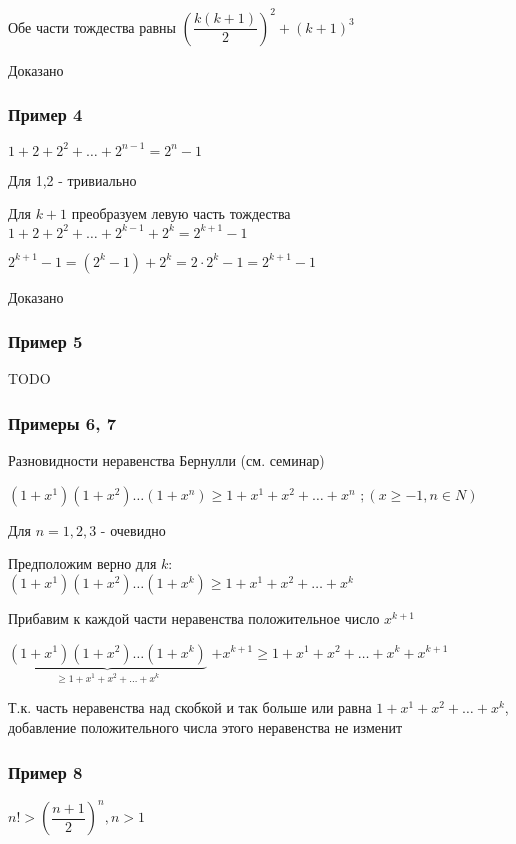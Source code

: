 Обе части тождества равны $  \left( \dfrac{k(k+1)}{2} \right)^{2} + (k+1)^{3} $

Доказано

\subsubsection{Пример 4}

$ 1 + 2 + 2^{2} + \ldots + 2^{n-1} = 2^{n} - 1  $

Для 1,2 - тривиально

Для $ k+1 $ преобразуем левую часть тождества
$ 1 + 2 + 2^{2} + \ldots + 2^{k-1} + 2^{k} = 2^{k+1} - 1  $

$ 2^{k+1} - 1 = (2^{k} - 1) + 2^{k} = 2 \cdot 2^{k} - 1 = 2^{k+1} - 1 $

Доказано

\subsubsection{Пример 5}

TODO

\subsubsection{Примеры 6, 7}

Разновидности неравенства Бернулли (см. семинар)

$(1+x^{1})(1+x^{2}) \ldots (1+x^{n}) \ge 1 + x^{1} + x^{2} + \ldots + x^{n}$
$; (x \ge -1, n \in N  ) $

Для $ n = 1,2,3 $ - очевидно

Предположим верно для $k$:
$(1+x^{1})(1+x^{2}) \ldots (1+x^{k}) \ge 1 + x^{1} + x^{2} + \ldots + x^{k}$

Прибавим к каждой части неравенства положительное число $ x^{k+1} $

$ \underbrace{(1+x^{1})(1+x^{2}) \ldots (1+x^{k})}_{\ge 1 + x^{1} + x^{2} + \ldots + x^{k}} $
$ + x^{k+1} \ge 1 + x^{1} + x^{2} + \ldots + x^{k} + x^{k+1}$

Т.к. часть неравенства над скобкой и так больше или равна 
$ 1 + x^{1} + x^{2} + \ldots + x^{k} $,
добавление положительного числа этого неравенства не изменит

\subsubsection{Пример 8}

$ n! >  \left( \dfrac{n+1}{2} \right)^{n}, n > 1 $

